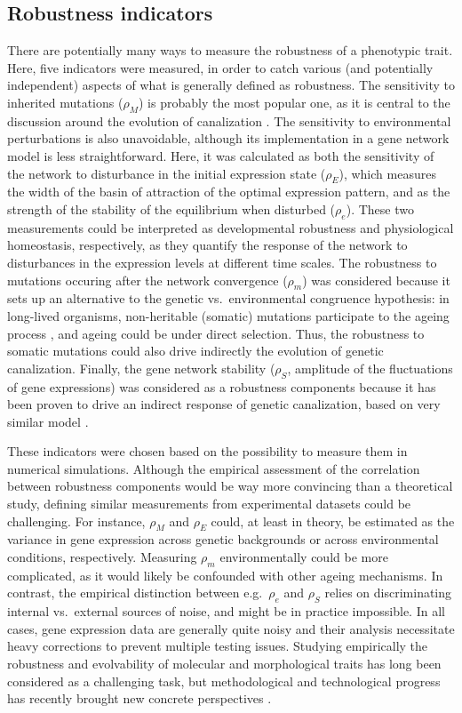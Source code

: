 \documentclass[10pt,a4paper]{article}
\newcommand{\stability}{{\rho_S}}
\newcommand{\earlyenv}{{\rho_E}}
\newcommand{\lateenv}{{\rho_e}}
\newcommand{\earlymut}{{\rho_M}}
\newcommand{\latemut}{{\rho_m}}
\begin{document}
\subsection{Robustness indicators}

There are potentially many ways to measure the robustness of a phenotypic trait. Here, five indicators were measured, in order to catch various (and potentially independent) aspects of what is generally defined as robustness. The sensitivity to inherited mutations ($\earlymut$) is probably the most popular one, as it is central to the discussion around the evolution of canalization \citep{Wad59, Wag96, Far15}. The sensitivity to environmental perturbations is also unavoidable, although its implementation in a gene network model is less straightforward. Here, it was calculated as both the sensitivity of the network to disturbance in the initial expression state ($\earlyenv$), which measures the width of the basin of attraction of the optimal expression pattern, and as the strength of the stability of the equilibrium when disturbed ($\lateenv$). These two measurements could be interpreted as developmental robustness and physiological homeostasis, respectively, as they quantify the response of the network to disturbances in the expression levels at different time scales. The robustness to mutations occuring after the network convergence ($\latemut$) was considered because it sets up an alternative to the genetic vs.\ environmental congruence hypothesis: in long-lived organisms, non-heritable (somatic) mutations participate to the ageing process \citep{KLH12}, and ageing could be under direct selection. Thus, the robustness to somatic mutations could also drive indirectly the evolution of genetic canalization. Finally, the gene network stability ($\stability$, amplitude of the fluctuations of gene expressions) was considered as a robustness components because it has been proven to drive an indirect response of genetic canalization, based on very similar model \citep{SB02}. 

These indicators were chosen based on the possibility to measure them in numerical simulations. Although the empirical assessment of the correlation between robustness components would be way more convincing than a theoretical study, defining similar measurements from experimental datasets could be challenging. For instance, $\earlymut$ and $\earlyenv$ could, at least in theory, be estimated as the variance in gene expression across genetic backgrounds or across environmental conditions, respectively. Measuring $\latemut$ environmentally could be more complicated, as it would likely be confounded with other ageing mechanisms. In contrast, the empirical distinction between e.g.\ $\lateenv$ and $\stability$ relies on discriminating internal vs.\ external sources of noise, and might be in practice impossible. In all cases, gene expression data are generally quite noisy and their analysis necessitate heavy corrections to prevent multiple testing issues. Studying empirically the robustness and evolvability of molecular and morphological traits has long been considered as a challenging task, but methodological and technological progress has recently brought new concrete perspectives \citep{PW19}. 
\end{document}
